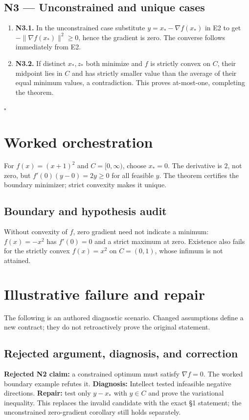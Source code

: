 \documentclass[preprint,12pt,aps,pra,showkeys,amsmath,amssymb,superscriptaddress,floatfix]{revtex4-2}
\theoremstyle{definition}
\theoremstyle{remark}
\begin{document}
\subsection{N3 --- Unconstrained and unique
cases}\label{n3-unconstrained-and-unique-cases}

\begin{enumerate}
\def\labelenumi{\arabic{enumi}.}
\item
  \textbf{N3.1.} In the unconstrained case substitute
  \(y=x_*-\nabla f(x_*)\) in E2 to get \(-\|\nabla f(x_*)\|^2\ge0\),
  hence the gradient is zero. The converse follows immediately from E2.
\item
  \textbf{N3.2.} If distinct \(x_*,z_*\) both minimize and \(f\) is
  strictly convex on \(C\), their midpoint lies in \(C\) and has
  strictly smaller value than the average of their equal minimum values,
  a contradiction. This proves at-most-one, completing the theorem.
\end{enumerate}

\hfill$\square$

\section{Worked orchestration}

For \(f(x)=(x+1)^2\) and \(C=[0,\infty)\), choose \(x_*=0\). The
derivative is \(2\), not zero, but \(f'(0)(y-0)=2y\ge0\) for all
feasible \(y\). The theorem certifies the boundary minimizer; strict
convexity makes it unique.

\subsection{Boundary and hypothesis audit}

Without convexity of \(f\), zero gradient need not indicate a minimum:
\(f(x)=-x^2\) has \(f'(0)=0\) and a strict maximum at zero. Existence
also fails for the strictly convex \(f(x)=x^2\) on \(C=(0,1)\), whose
infimum is not attained.

\section{Illustrative failure and repair}

The following is an authored diagnostic scenario. Changed assumptions
define a new contract; they do not retroactively prove the original
statement.

\subsection{Rejected argument, diagnosis, and correction}
\textbf{Rejected N2 claim:} a constrained optimum must satisfy
\(\nabla f=0\). The worked boundary example refutes it.
\textbf{Diagnosis:} Intellect tested infeasible negative directions.
\textbf{Repair:} test only \(y-x_*\) with \(y\in C\) and prove the
variational inequality. This replaces the invalid candidate with the
exact §1 statement; the unconstrained zero-gradient corollary still
holds separately.
\end{document}
